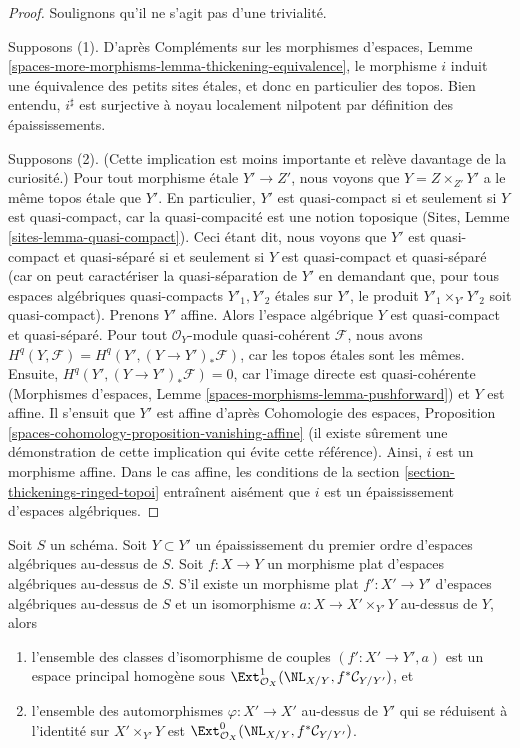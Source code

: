 \begin{proof}
Soulignons qu'il ne s'agit pas d'une trivialité.

\medskip\noindent
Supposons (1). D'après Compléments sur les morphismes d'espaces,
Lemme \ref{spaces-more-morphisms-lemma-thickening-equivalence}, le morphisme
$i$ induit une équivalence des petits sites étales, et donc en particulier des
topos. Bien entendu, $i^\sharp$ est surjective à noyau localement nilpotent par
définition des épaississements.

\medskip\noindent
Supposons (2). (Cette implication est moins importante et relève davantage de
la curiosité.) Pour tout morphisme étale $Y' \to Z'$, nous voyons que
$Y = Z \times_{Z'} Y'$ a le même topos étale que $Y'$. En particulier, $Y'$ est
quasi-compact si et seulement si $Y$ est quasi-compact, car la quasi-compacité
est une notion toposique (Sites, Lemme \ref{sites-lemma-quasi-compact}).
Ceci étant dit, nous voyons que $Y'$ est quasi-compact et quasi-séparé si et
seulement si $Y$ est quasi-compact et quasi-séparé (car on peut caractériser la
quasi-séparation de $Y'$ en demandant que, pour tous espaces algébriques
quasi-compacts $Y'_1, Y'_2$ étales sur $Y'$, le produit
$Y'_1 \times_{Y'} Y'_2$ soit quasi-compact).
Prenons $Y'$ affine. Alors l'espace algébrique $Y$ est quasi-compact et
quasi-séparé. Pour tout $\mathcal{O}_Y$-module quasi-cohérent $\mathcal{F}$,
nous avons
$H^q(Y, \mathcal{F}) = H^q(Y', (Y \to Y')_*\mathcal{F})$, car les topos étales
sont les mêmes. Ensuite,
$H^q(Y', (Y \to Y')_*\mathcal{F}) = 0$, car l'image directe est
quasi-cohérente (Morphismes d'espaces,
Lemme \ref{spaces-morphisms-lemma-pushforward}) et $Y$ est affine.
Il s'ensuit que $Y'$ est affine d'après Cohomologie des espaces, Proposition
\ref{spaces-cohomology-proposition-vanishing-affine} (il existe sûrement une
démonstration de cette implication qui évite cette référence).
Ainsi, $i$ est un morphisme affine. Dans le cas affine, les conditions de la
section \ref{section-thickenings-ringed-topoi} entraînent aisément que $i$ est
un épaississement d'espaces algébriques.
\end{proof}

\begin{lemma}
\label{lemma-deform-spaces}
Soit $S$ un schéma.
Soit $Y \subset Y'$ un épaississement du premier ordre d'espaces algébriques
au-dessus de $S$.
Soit $f : X \to Y$ un morphisme plat d'espaces algébriques au-dessus de $S$.
S'il existe un morphisme plat $f' : X' \to Y'$ d'espaces algébriques au-dessus
de $S$ et un isomorphisme $a : X \to X' \times_{Y'} Y$ au-dessus de $Y$, alors
\begin{enumerate}
\item l'ensemble des classes d'isomorphisme de couples
$(f' : X' \to Y', a)$ est un espace principal homogène sous
$\Ext^1_{\mathcal{O}_X}(\NL_{X/Y}, f^*\mathcal{C}_{Y/Y'})$, et
\item l'ensemble des automorphismes $\varphi : X' \to X'$ au-dessus de $Y'$
qui se réduisent à l'identité sur $X' \times_{Y'} Y$ est
$\Ext^0_{\mathcal{O}_X}(\NL_{X/Y}, f^*\mathcal{C}_{Y/Y'})$.
\end{enumerate}
\end{lemma}

